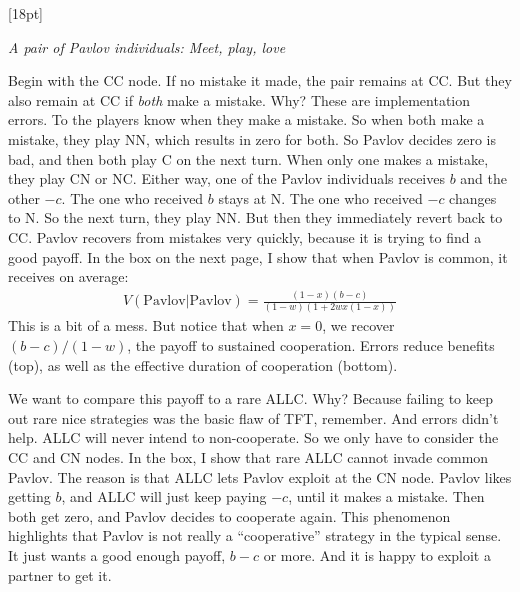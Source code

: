 \documentclass[10pt,reqno]{amsbook}
\newcommand{\margincap}[2][10pt]{\marginnote{\small\emph{#2}}[#1]}
\newcounter{myfigure}[chapter]
\newcommand{\figmarlab}[2][18pt]{%
  \refstepcounter{myfigure}%
  \label{#2}%
  \margincap[#1]{Figure\\\thechapter.\themyfigure}%
}
\numberwithin{equation}{chapter}
\begin{document}
\vspace{-6pt}
\figmarlab{figR2pavlovpavlov}
\begin{center}

	\emph{A pair of Pavlov individuals: Meet, play, love}
	\vspace{6pt}
\end{center}

Begin with the CC node. If no mistake it made, the pair remains at CC. But they also remain at CC if \emph{both} make a mistake. Why? These are implementation errors. To the players know when they make a mistake. So when both make a mistake, they play NN, which results in zero for both. So Pavlov decides zero is bad, and then both play C on the next turn.
When only one makes a mistake, they play CN or NC. Either way, one of the Pavlov individuals receives $b$ and the other $-c$. The one who received $b$ stays at N. The one who received $-c$ changes to N. So the next turn, they play NN. But then they immediately revert back to CC. Pavlov recovers from mistakes very quickly, because it is trying to find a good payoff. In the box on the next page, I show that when Pavlov is common, it receives on average:
\begin{align*}
	V(\text{Pavlov}|\text{Pavlov}) = \frac{(1-x) (b-c)}{(1-w) (1 + 2 w x(1-x))}
\end{align*}
This is a bit of a mess. But notice that when $x=0$, we recover $(b-c)/(1-w)$, the payoff to sustained cooperation. Errors reduce benefits (top), as well as the effective duration of cooperation (bottom).

We want to compare this payoff to a rare ALLC. Why? Because failing to keep out rare nice strategies was the basic flaw of TFT, remember. And errors didn't help. ALLC will never intend to non-cooperate. So we only have to consider the CC and CN nodes. In the box, I show that rare ALLC cannot invade common Pavlov. The reason is that ALLC lets Pavlov exploit at the CN node. Pavlov likes getting $b$, and ALLC will just keep paying $-c$, until it makes a mistake. Then both get zero, and Pavlov decides to cooperate again. This phenomenon highlights that Pavlov is not really a ``cooperative'' strategy in the typical sense. It just wants a good enough payoff, $b-c$ or more. And it is happy to exploit a partner to get it.
\end{document}
